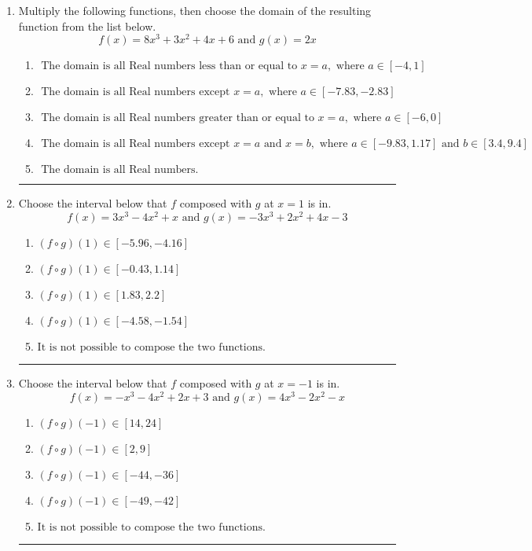 \documentclass[14pt]{extbook}
\newcommand{\litem}[1]{\item#1\hspace*{-1cm}\rule{\textwidth}{0.4pt}}
\begin{document}
\begin{enumerate}
{\begin{enumerate}[label=\Alph*.]
\end{enumerate} }
\litem{
Multiply the following functions, then choose the domain of the resulting function from the list below.\[ f(x) = 8x^{3} +3 x^{2} +4 x + 6 \text{ and } g(x) = 2x \]\begin{enumerate}[label=\Alph*.]
\item \( \text{ The domain is all Real numbers less than or equal to } x = a, \text{ where } a \in [-4, 1] \)
\item \( \text{ The domain is all Real numbers except } x = a, \text{ where } a \in [-7.83, -2.83] \)
\item \( \text{ The domain is all Real numbers greater than or equal to } x = a, \text{ where } a \in [-6, 0] \)
\item \( \text{ The domain is all Real numbers except } x = a \text{ and } x = b, \text{ where } a \in [-9.83, 1.17] \text{ and } b \in [3.4, 9.4] \)
\item \( \text{ The domain is all Real numbers. } \)

\end{enumerate} }
\litem{
Choose the interval below that $f$ composed with $g$ at $x=1$ is in.\[ f(x) = 3x^{3} -4 x^{2} +x \text{ and } g(x) = -3x^{3} +2 x^{2} +4 x -3 \]\begin{enumerate}[label=\Alph*.]
\item \( (f \circ g)(1) \in [-5.96, -4.16] \)
\item \( (f \circ g)(1) \in [-0.43, 1.14] \)
\item \( (f \circ g)(1) \in [1.83, 2.2] \)
\item \( (f \circ g)(1) \in [-4.58, -1.54] \)
\item \( \text{It is not possible to compose the two functions.} \)

\end{enumerate} }
\litem{
Choose the interval below that $f$ composed with $g$ at $x=-1$ is in.\[ f(x) = -x^{3} -4 x^{2} +2 x + 3 \text{ and } g(x) = 4x^{3} -2 x^{2} -x \]\begin{enumerate}[label=\Alph*.]
\item \( (f \circ g)(-1) \in [14, 24] \)
\item \( (f \circ g)(-1) \in [2, 9] \)
\item \( (f \circ g)(-1) \in [-44, -36] \)
\item \( (f \circ g)(-1) \in [-49, -42] \)
\item \( \text{It is not possible to compose the two functions.} \)


\end{enumerate}}
\end{enumerate}
\end{document}
